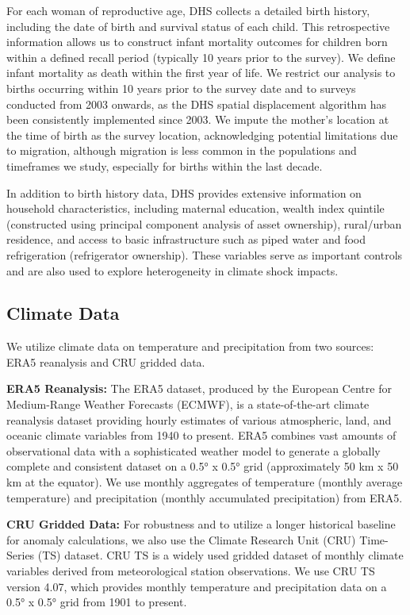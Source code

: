 \documentclass[12pt]{article}
\begin{document}
For each woman of reproductive age, DHS collects a detailed birth history, including the date of birth and survival status of each child. This retrospective information allows us to construct infant mortality outcomes for children born within a defined recall period (typically 10 years prior to the survey).  We define infant mortality as death within the first year of life. We restrict our analysis to births occurring within 10 years prior to the survey date and to surveys conducted from 2003 onwards, as the DHS spatial displacement algorithm has been consistently implemented since 2003.  We impute the mother's location at the time of birth as the survey location, acknowledging potential limitations due to migration, although migration is less common in the populations and timeframes we study, especially for births within the last decade.

In addition to birth history data, DHS provides extensive information on household characteristics, including maternal education, wealth index quintile (constructed using principal component analysis of asset ownership), rural/urban residence, and access to basic infrastructure such as piped water and food refrigeration (refrigerator ownership). These variables serve as important controls and are also used to explore heterogeneity in climate shock impacts.

\subsection{Climate Data}

We utilize climate data on temperature and precipitation from two sources: ERA5 reanalysis and CRU gridded data.

\textbf{ERA5 Reanalysis:}  The ERA5 dataset, produced by the European Centre for Medium-Range Weather Forecasts (ECMWF), is a state-of-the-art climate reanalysis dataset providing hourly estimates of various atmospheric, land, and oceanic climate variables from 1940 to present. ERA5 combines vast amounts of observational data with a sophisticated weather model to generate a globally complete and consistent dataset on a 0.5° x 0.5° grid (approximately 50 km x 50 km at the equator). We use monthly aggregates of temperature (monthly average temperature) and precipitation (monthly accumulated precipitation) from ERA5.

\textbf{CRU Gridded Data:}  For robustness and to utilize a longer historical baseline for anomaly calculations, we also use the Climate Research Unit (CRU) Time-Series (TS) dataset.  CRU TS is a widely used gridded dataset of monthly climate variables derived from meteorological station observations.  We use CRU TS version 4.07, which provides monthly temperature and precipitation data on a 0.5° x 0.5° grid from 1901 to present.
\end{document}
